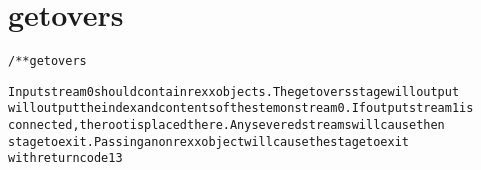 \section{getovers}
\begin{shaded}
\begin{alltt}
/** getovers

Input stream 0 should contain rexx objects.  The getovers stage will output
will output the index and contents of the stem on stream 0.  If output stream 1 is
connected, the root is placed there.  Any severed streams will cause then
stage to exit.  Passing a non rexx object will cause the stage to exit
with return code 13

\end{alltt}
\end{shaded}
